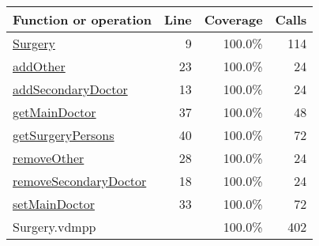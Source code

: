 \begin{longtable}{|l|r|r|r|}
\hline
Function or operation & Line & Coverage & Calls \\
\hline
\hline
\hyperref[Surgery:9]{Surgery} & 9&100.0\% & 114 \\
\hline
\hyperref[addOther:23]{addOther} & 23&100.0\% & 24 \\
\hline
\hyperref[addSecondaryDoctor:13]{addSecondaryDoctor} & 13&100.0\% & 24 \\
\hline
\hyperref[getMainDoctor:37]{getMainDoctor} & 37&100.0\% & 48 \\
\hline
\hyperref[getSurgeryPersons:40]{getSurgeryPersons} & 40&100.0\% & 72 \\
\hline
\hyperref[removeOther:28]{removeOther} & 28&100.0\% & 24 \\
\hline
\hyperref[removeSecondaryDoctor:18]{removeSecondaryDoctor} & 18&100.0\% & 24 \\
\hline
\hyperref[setMainDoctor:33]{setMainDoctor} & 33&100.0\% & 72 \\
\hline
\hline
Surgery.vdmpp & & 100.0\% & 402 \\
\hline
\end{longtable}

